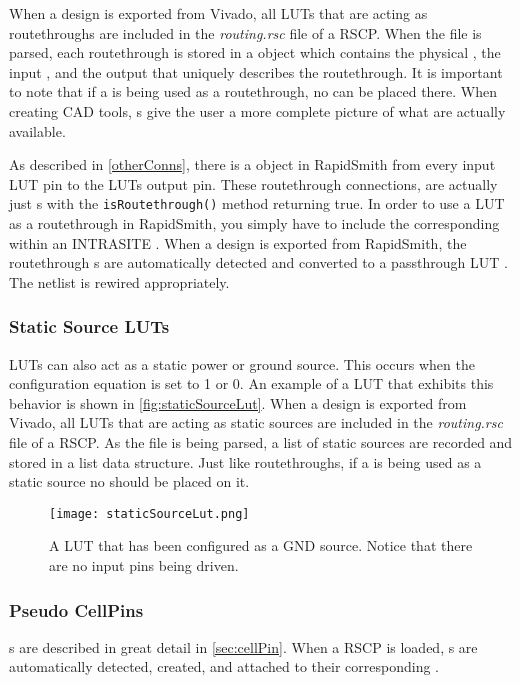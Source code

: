 \noindent
When a design is exported from Vivado, all LUTs that are acting as routethroughs
are included in the \textit{routing.rsc} file of a RSCP. When the file is
parsed, each routethrough is stored in a  object which
contains the physical \bel, the input \belpin, and the output \belpin that
uniquely describes the routethrough. It is important to note that if a \bel is
being used as a routethrough, no \cell can be placed there. When creating CAD
tools, s give the user a more complete picture of what
\bels are actually available. 
	
As described in \autoref{otherConns}, there is a  object in
RapidSmith from every input LUT pin to the LUTs output pin. These \bel
routethrough connections, are actually just s with the
\texttt{isRoute\-through()} method returning true. In order to use a LUT as a
routethrough in RapidSmith, you simply have to include the corresponding
 within an INTRASITE . When a design is
exported from RapidSmith, the routethrough s are
automatically detected and converted to a passthrough LUT \cell. The netlist
is rewired appropriately.

\subsubsection{Static Source LUTs}
LUTs can also act as a static power or ground source. This occurs when the
configuration equation is set to 1 or 0. An example of a LUT that exhibits
this behavior is shown in \autoref{fig:staticSourceLut}. When a design
is exported from Vivado, all LUTs that are acting as static sources are
included in the \textit{routing.rsc} file of a RSCP. As the file is being
parsed, a list of static sources \bels are recorded and stored in a list data
structure. Just like routethroughs, if a \bel is being used as a static source
no \cell should be placed on it.

\begin{figure}[h]
  \centering
  \texttt{[image: staticSourceLut.png]}
  \caption{A LUT \bel that has been configured as a GND source. Notice that
  there are no input pins being driven.}
  \label{fig:staticSourceLut}
\end{figure}

\subsubsection{Pseudo CellPins}
s are described in great detail in \autoref{sec:cellPin}.
When a RSCP is loaded, s are automatically detected,
created, and attached to their corresponding \cells.

